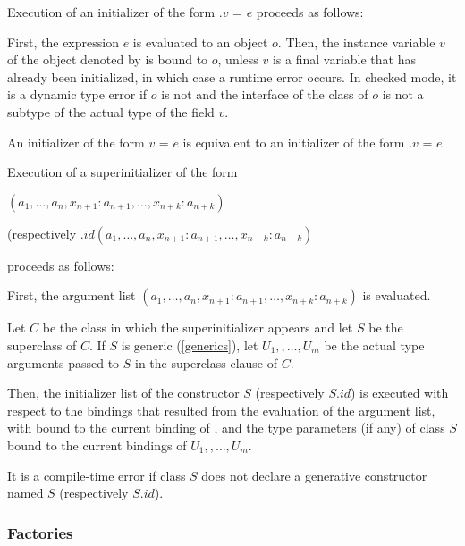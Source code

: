 \documentclass{article}
\newcommand{\code}[1]{{\sf #1}}
\begin{document}

\LMHash{}
Execution of an initializer of the form \code{\THIS{}.$v$ = $e$} proceeds as follows:

\LMHash{}
First, the expression $e$ is evaluated to an object $o$. Then, the instance variable $v$ of the object denoted by \THIS{} is bound to $o$, unless $v$ is a final variable that has already been initialized, in which case a runtime error occurs. In checked mode, it is a dynamic type error if $o$ is not \NULL{} and the interface of the class of $o$ is not a subtype of the actual type of the field $v$.

\LMHash{}
An initializer of the form \code{$v$ = $e$} is equivalent to an initializer of the form  \code{\THIS{}.$v$ = $e$}. 

\LMHash{}
Execution of a superinitializer of the form 

\SUPER{}$(a_1, \ldots, a_n,  x_{n+1}: a_{n+1}, \ldots, x_{n+k}: a_{n+k})$ 

(respectively  \SUPER{}$.id(a_1, \ldots, a_n, x_{n+1}: a_{n+1}, \ldots, x_{n+k}: a_{n+k})$ 

proceeds as follows:

\LMHash{}
First, the argument list $(a_1, \ldots, a_n, x_{n+1}: a_{n+1}, \ldots, x_{n+k}: a_{n+k})$ is evaluated.

\LMHash{}
Let $C$ be the class in which the superinitializer appears and let $S$ be the superclass of $C$.  If $S$ is generic (\ref{generics}), let $U_1, , \ldots, U_m$ be the actual type arguments passed to $S$ in the superclass clause of $C$.

\LMHash{}
Then, the initializer list of the constructor $S$ (respectively $S.id$) is executed with respect to the bindings that resulted from the evaluation of the argument list,  with \THIS{} bound to the current binding of \THIS{}, and  the type parameters (if any) of class $S$ bound to the current bindings of $U_1, , \ldots, U_m$.

\LMHash{}
It is a compile-time error if class $S$ does not declare a generative constructor named $S$ (respectively $S.id$).

\subsubsection{Factories}
\end{document}
